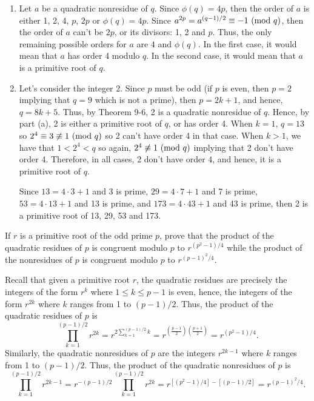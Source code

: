 \begin{solution}
    \begin{enumerate}
        \item  Let $a$ be a quadratic nonresidue of $q$. Since $\phi(q) = 4p$, then the order of $a$ is either 1, 2, 4, $p$, $2p$ or $\phi(q) = 4p$. Since $a^{2p} = a^{(q-1)/2} \equiv -1 \ (\mathrm{mod}\ q)$, then the order of $a$ can't be $2p$, or its divisors: 1, 2 and $p$. Thus, the only remaining possible orders for $a$ are $4$ and $\phi(q)$. In the first case, it would mean that $a$ has order 4 modulo $q$. In the second case, it would mean that $a$ is a primitive root of $q$.
        \item Let's consider the integer 2. Since $p$ must be odd (if $p$ is even, then $p = 2$ implying that $q = 9$ which is not a prime), then $p = 2k+1$, and hence, $q = 8k + 5$. Thus, by Theorem 9-6, 2 is a quadratic nonresidue of $q$. Hence, by part (a), 2 is either a primitive root of $q$, or has order 4. When $k = 1$, $q = 13$ so $2^4 \equiv 3 \not\equiv 1 \ (\mathrm{mod}\ q)$ so 2 can't have order 4 in that case. When $k > 1$, we have that $1 < 2^4 < q$ so again, $2^4 \not\equiv 1 \ (\mathrm{mod}\ q)$ implying that 2 don't have order 4. Therefore, in all cases, 2 don't have order 4, and hence, it is a primitive root of $q$.
        
        Since $13 = 4\cdot 3 + 1$ and 3 is prime, $29 = 4\cdot 7 + 1$ and 7 is prime, $53 = 4\cdot 13 + 1$ and 13 is prime, and $173 = 4\cdot 43 + 1$ and 43 is prime, then 2 is a primitive root of 13, 29, 53 and 173. \\
    \end{enumerate}
\end{solution}

\begin{exercise}
    If $r$ is a primitive root of the odd prime $p$, prove that the product of the quadratic residues of $p$ is congruent modulo $p$ to $r^{(p^2 - 1)/4}$ while the product of the nonresidues of $p$ is congruent modulo $p$ to $r^{(p-1)^2/4}$.  \\
\end{exercise}

\begin{solution}
    Recall that given a primitive root $r$, the quadratic residues are precisely the integers of the form $r^k$ where $1 \leq k \leq p-1$ is even, hence, the integers of the form $r^{2k}$ where $k$ ranges from 1 to $(p-1)/2$. Thus, the product of the quadratic residues of $p$ is
    $$\prod_{k=1}^{(p-1)/2}r^{2k} = r^{2\sum_{k=1}^{(p-1)/2}k} = r^{(\frac{p-1}{2})(\frac{p+1}{2})} = r^{(p^2 - 1)/4}.$$
    Similarly, the quadratic nonresidues of $p$ are the integers $r^{2k-1}$ where $k$ ranges from 1 to $(p-1)/2$. Thus, the product of the quadratic nonresidues of $p$ is
    $$\prod_{k=1}^{(p-1)/2}r^{2k-1} = r^{-(p-1)/2}\prod_{k=1}^{(p-1)/2}r^{2k} = r^{[(p^2 - 1)/4] - [(p-1)/2]} = r^{(p-1)^2/4}.$$ \\
\end{solution}

